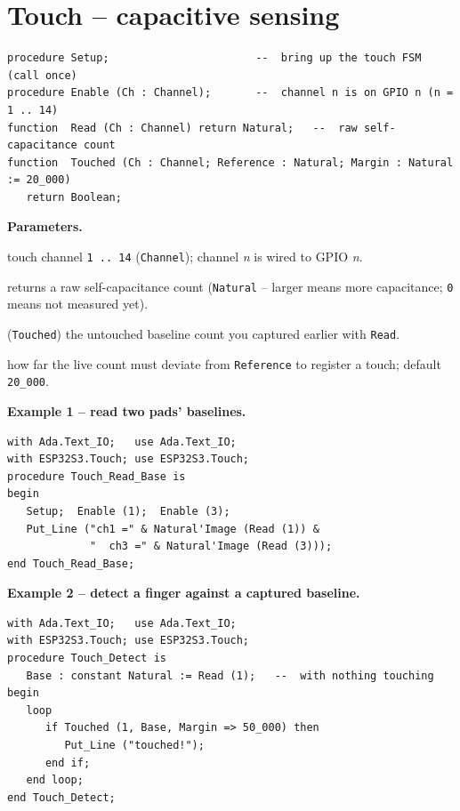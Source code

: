 \section{Touch -- capacitive sensing}

\begin{lstlisting}
procedure Setup;                       --  bring up the touch FSM (call once)
procedure Enable (Ch : Channel);       --  channel n is on GPIO n (n = 1 .. 14)
function  Read (Ch : Channel) return Natural;   --  raw self-capacitance count
function  Touched (Ch : Channel; Reference : Natural; Margin : Natural := 20_000)
   return Boolean;
\end{lstlisting}

\textbf{Parameters.}
\begin{description}[style=nextline]
\item[\texttt{Ch}] touch channel \texttt{1\,..\,14} (\texttt{Channel}); channel
  \emph{n} is wired to GPIO \emph{n}.
\item[\texttt{Read}] returns a raw self-capacitance count (\texttt{Natural} --
  larger means more capacitance; \texttt{0} means not measured yet).
\item[\texttt{Reference}] (\texttt{Touched}) the untouched baseline count you
  captured earlier with \texttt{Read}.
\item[\texttt{Margin}] how far the live count must deviate from \texttt{Reference}
  to register a touch; default \texttt{20\_000}.
\end{description}

\textbf{Example 1 -- read two pads' baselines.}
\begin{lstlisting}
with Ada.Text_IO;   use Ada.Text_IO;
with ESP32S3.Touch; use ESP32S3.Touch;
procedure Touch_Read_Base is
begin
   Setup;  Enable (1);  Enable (3);
   Put_Line ("ch1 =" & Natural'Image (Read (1)) &
             "  ch3 =" & Natural'Image (Read (3)));
end Touch_Read_Base;
\end{lstlisting}

\textbf{Example 2 -- detect a finger against a captured baseline.}
\begin{lstlisting}
with Ada.Text_IO;   use Ada.Text_IO;
with ESP32S3.Touch; use ESP32S3.Touch;
procedure Touch_Detect is
   Base : constant Natural := Read (1);   --  with nothing touching
begin
   loop
      if Touched (1, Base, Margin => 50_000) then
         Put_Line ("touched!");
      end if;
   end loop;
end Touch_Detect;
\end{lstlisting}

